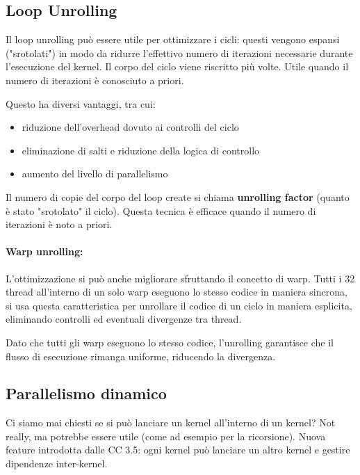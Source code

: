 \subsection{Loop Unrolling}

Il loop unrolling può essere utile per ottimizzare i cicli: questi vengono espansi ("srotolati") in modo da ridurre l'effettivo numero di iterazioni necessarie durante l'esecuzione del kernel. Il corpo del ciclo viene riscritto più volte. Utile quando il numero di iterazioni è conosciuto a priori. 

Questo ha diversi vantaggi, tra cui: 
\begin{itemize}
	\item riduzione dell'overhead dovuto ai controlli del ciclo
	
	\item eliminazione di salti e riduzione della logica di controllo 
	
	\item aumento del livello di parallelismo
\end{itemize}

Il numero di copie del corpo del loop create si chiama \textbf{unrolling factor} (quanto è stato "srotolato" il ciclo). Questa tecnica è efficace quando il numero di iterazioni è noto a priori.

\paragraph{Warp unrolling:} L'ottimizzazione si può anche migliorare sfruttando il concetto di warp. Tutti i 32 thread all'interno di un solo warp eseguono lo stesso codice in maniera sincrona, si usa questa caratteristica per unrollare il codice di un ciclo in maniera esplicita, eliminando controlli ed eventuali divergenze tra thread. 

Dato che tutti gli warp eseguono lo stesso codice, l'unrolling garantisce che il flusso di esecuzione rimanga uniforme, riducendo la divergenza. 


\subsection{Parallelismo dinamico}

Ci siamo mai chiesti se si può lanciare un kernel all'interno di un kernel? Not really, ma potrebbe essere utile (come ad esempio per la ricorsione). Nuova feature introdotta dalle CC 3.5: ogni kernel può lanciare un altro kernel e gestire dipendenze inter-kernel. 


